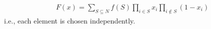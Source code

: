 \begin{definition}
	\begin{align}
	F(x) = \sum_{S \subseteq N} f(S) \prod_{i\in S} x_i \prod_{i \notin S} (1-x_i)
	\end{align}
	i.e., each element is chosen independently.
\end{definition}
